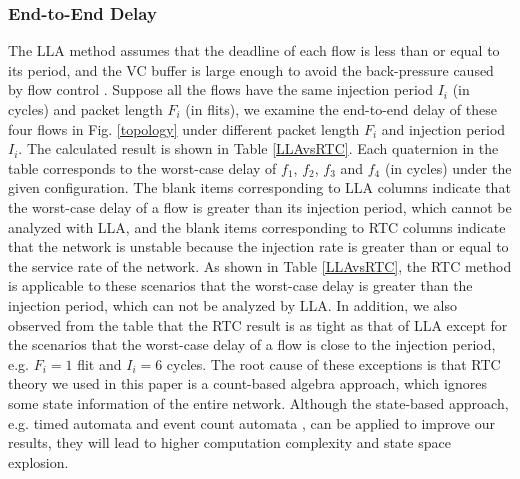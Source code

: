 \documentclass[preprint]{elsarticle}
\begin{document}
\subsubsection{End-to-End Delay}
The LLA method assumes that the deadline of each flow is less than or equal to its period, and the VC buffer is large enough to avoid the back-pressure caused by flow control \cite{189}. Suppose all the flows have the same injection period $I_i$ (in cycles) and packet length $F_i$ (in flits), we examine the end-to-end delay of these four flows in Fig. \ref{topology} under different packet length $F_i$ and injection period $I_i$. The calculated result is shown in Table \ref{LLAvsRTC}. Each quaternion in the table corresponds to the worst-case delay of $f_1$, $f_2$, $f_3$ and $f_4$ (in cycles) under the given configuration. The blank items corresponding to LLA columns indicate that the worst-case delay of a flow is greater than its injection period, which cannot be analyzed with LLA, and the blank items corresponding to RTC columns indicate that the network is unstable because the injection rate is greater than or equal to the service rate of the network. As shown in Table \ref{LLAvsRTC}, the RTC method is applicable to these scenarios that the worst-case delay is greater than the injection period, which can not be analyzed by LLA. In addition, we also observed from the table that the RTC result is as tight as that of LLA except for the scenarios that the worst-case delay of a flow is close to the injection period, e.g. $F_i=1$ flit and $I_i=6$ cycles. The root cause of these exceptions is that RTC theory we used in this paper is a count-based algebra approach, which ignores some state information of the entire network. Although the state-based approach, e.g. timed automata \cite{Fersman2006301} and event count automata \cite{Chakraborty:2005:ECA:1106608.1106642}, can be applied to improve our results, they will lead to higher computation complexity and state space explosion.
\end{document}
